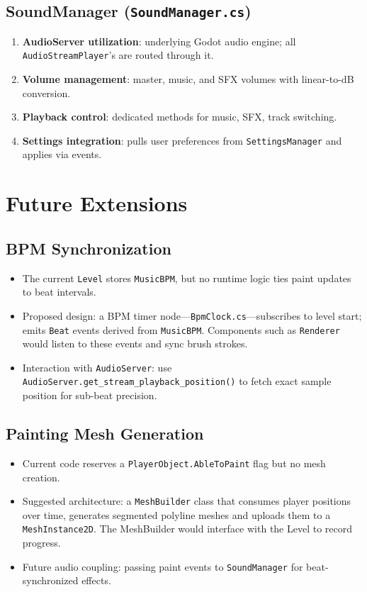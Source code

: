 \documentclass{report}
\begin{document}
\section{SoundManager (\texttt{SoundManager.cs})}
\begin{enumerate}[label=\alph*)]
	\item\textbf{AudioServer utilization}: underlying Godot audio engine; all \texttt{AudioStreamPlayer}'s are routed through it.
	\item\textbf{Volume management}: master, music, and SFX volumes with linear-to-dB conversion.
	\item\textbf{Playback control}: dedicated methods for music, SFX, track switching.
	\item\textbf{Settings integration}: pulls user preferences from \texttt{SettingsManager} and applies via events.
\end{enumerate}

\chapter{Future Extensions}
\section{BPM Synchronization}
\begin{itemize}[noitemsep]
	\item The current \texttt{Level} stores \texttt{MusicBPM}, but no runtime logic ties paint updates to beat intervals.
	\item Proposed design: a BPM timer node---\texttt{BpmClock.cs}---subscribes to level start; emits \texttt{Beat} events derived from \texttt{MusicBPM}. Components such as \texttt{Renderer} would listen to these events and sync brush strokes.
	\item Interaction with \texttt{AudioServer}: use \texttt{AudioServer.get\_stream\_playback\_position()} to fetch exact sample position for sub-beat precision.
\end{itemize}

\section{Painting Mesh Generation}
\begin{itemize}[noitemsep]
	\item Current code reserves a \texttt{PlayerObject.AbleToPaint} flag but no mesh creation.
	\item Suggested architecture: a \texttt{MeshBuilder} class that consumes player positions over time, generates segmented polyline meshes and uploads them to a \texttt{MeshInstance2D}. The MeshBuilder would interface with the Level to record progress.
	\item Future audio coupling: passing paint events to \texttt{SoundManager} for beat-synchronized effects.
\end{itemize}

\newpage
% 
% 
\end{document}
